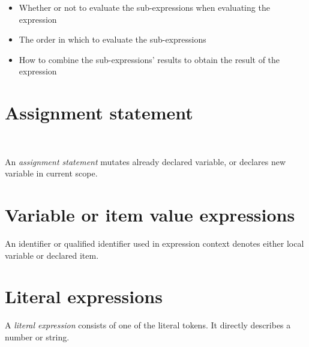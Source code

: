 \begin{itemize}
  \item Whether or not to evaluate the sub-expressions when evaluating the expression
  \item The order in which to evaluate the sub-expressions
  \item How to combine the sub-expressions' results to obtain the result of the expression
\end{itemize}

\section{Assignment statement}


\begin{bnf}
   \eq {} \ \term{=} \   
\end{bnf}

An \emph{assignment statement} mutates already declared variable, or declares new variable in current scope.

\section{Variable or item value expressions}

\begin{bnf}
   \eq {} \gor {}
\end{bnf}

An identifier or qualified identifier used in expression context denotes either local variable or declared item.

\section{Literal expressions}

\begin{bnf}
   \eq {}
\end{bnf}

A \emph{literal expression} consists of one of the literal tokens. It directly describes a number or string.


